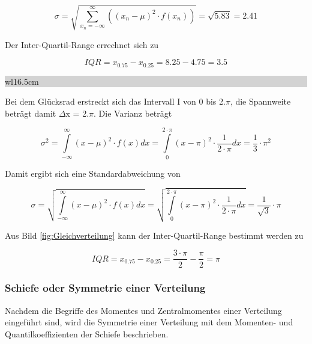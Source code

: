 \begin{equation}\label{eq:foursixtytwo}
\sigma =\sqrt{\sum _{x_{n} =-\infty }^{\infty }\left((x_{n} -\mu)^{2} \cdot f(x_{n})\right) } =\sqrt{5.83} =2.41
\end{equation}

\noindent Der Inter-Quartil-Range errechnet sich zu

\begin{equation}\label{eq:foursixtythree}
IQR=x_{0.75} -x_{0.25} =8.25-4.75=3.5
\end{equation}

\noindent
\colorbox{lightgray}{%
%
\renewcommand\arraystretch{0.6}%
\begin{tabular}{ wl{16.5cm} }
{}
\end{tabular}%
}\medskip 

\noindent Bei dem Gl\"{u}cksrad erstreckt sich das Intervall I von 0 bis 2$.\pi$, die Spannweite betr\"{a}gt damit $\Delta$x = 2$.\pi$. Die Varianz betr\"{a}gt

\begin{equation}\label{eq:foursixtyfour}
\sigma ^{2} =\int\limits _{-\infty }^{\infty }(x-\mu)^{2} \cdot f(x)dx =\int\limits _{0}^{2\cdot \pi}(x-\pi)^{2} \cdot \dfrac{1}{2\cdot \pi} dx =\dfrac{1}{3} \cdot \pi ^{2}
\end{equation}

\noindent Damit ergibt sich eine Standardabweichung von 

\begin{equation}\label{eq:foursixtyfive}
\sigma =\sqrt{\int\limits _{-\infty}^{\infty}\left(x-\mu \right)^{2} \cdot f(x)dx} =\sqrt{\int\limits _{0}^{2\cdot \pi}(x-\pi)^{2} \cdot \dfrac{1}{2\cdot \pi} dx} =\dfrac{1}{\sqrt{3}} \cdot \pi
\end{equation}

\noindent Aus Bild \ref{fig:Gleichverteilung} kann der Inter-Quartil-Range bestimmt werden zu

\begin{equation}\label{eq:foursixtysix}
IQR=x_{0.75} -x_{0.25} =\dfrac{3\cdot \pi}{2} -\dfrac{\pi}{2} =\pi
\end{equation}

\subsubsection{Schiefe oder Symmetrie einer Verteilung}

\noindent Nachdem die Begriffe des Momentes und Zentralmomentes einer Verteilung eingef\"{u}hrt sind, wird die Symmetrie einer Verteilung mit dem Momenten- und Quantilkoeffizienten der Schiefe beschrieben. 

